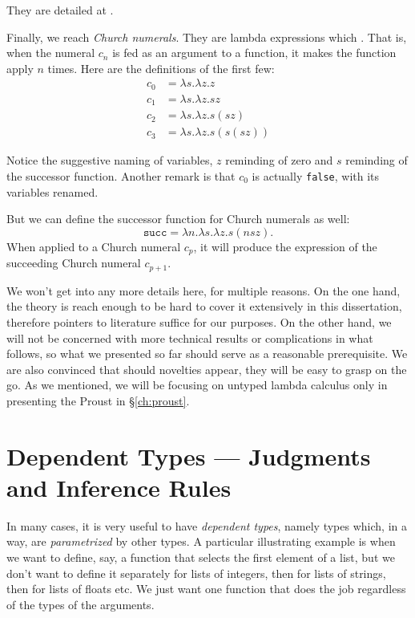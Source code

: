 They are detailed at \cite[pp. 59-60]{tapl}.

Finally, we reach \emph{Church numerals}. They are lambda expressions
which . That is, when the numeral $ c_n $ is fed
as an argument to a function, it makes the function apply $ n $ times.
Here are the definitions of the first few:
\begin{align*}
  c_0 &= \lambda s . \lambda z . z \\
  c_1 &= \lambda s . \lambda z . s z \\
  c_2 &= \lambda s . \lambda z . s (s z) \\
  c_3 &= \lambda s . \lambda z . s (s (s z))
\end{align*}

Notice the suggestive naming of variables, $ z $ reminding of zero
and $ s $ reminding of the successor function. Another remark is that
$ c_0 $ is actually \texttt{false}, with its variables renamed.

But we can define the successor function for Church numerals as well:
\[
  \texttt{succ} = \lambda n . \lambda s . \lambda z . s (n s z).
\]
When applied to a Church numeral $ c_p $, it will produce the expression
of the succeeding Church numeral $ c_{p + 1} $.

We won't get into any more details here, for multiple reasons. On the
one hand, the theory is reach enough to be hard to cover it extensively
in this dissertation, therefore pointers to literature suffice for our
purposes. On the other hand, we will not be concerned with more technical
results or complications in what follows, so what we presented so far
should serve as a reasonable prerequisite. We are also convinced that
should novelties appear, they will be easy to grasp on the go.
As we mentioned, we will be focusing on untyped lambda calculus only in
presenting the Proust  in \S\ref{ch:proust}.

\section{Dependent Types --- Judgments and Inference Rules}
\label{sec:depty}

\indent\indent In many cases, it is very useful to have \emph{dependent types}, namely
types which, in a way, are \emph{parametrized} by other types. A particular
illustrating example is when we want to define, say, a function that selects
the first element of a list, but we don't want to define it separately
for lists of integers, then for lists of strings, then for lists of floats
etc. We just want one function that does the job regardless of the types
of the arguments.

